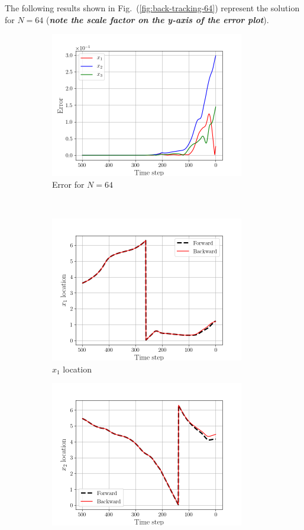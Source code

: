 The following results shown in Fig.~(\ref{fig:back-tracking-64}) represent
the solution for $N=64$ (\emph{\textbf{note the scale factor on the
y-axis of the error plot}}).
\begin{figure}[H]
    \begin{subfigure}[H]{0.45\textwidth}
        \includegraphics[height=2.5in]{media/rk4/run-64/error-64.png}
        \caption{Error for $N=64$}
    \end{subfigure}
    ~
    \begin{subfigure}[H]{0.45\textwidth}
        \includegraphics[height=2.5in]{media/rk4/run-64/x1-64-tracking.png}
        \caption{$x_{1}$ location}
    \end{subfigure}
    \newline
    \begin{subfigure}[H]{0.45\textwidth}
        \includegraphics[height=2.5in]{media/rk4/run-64/x2-64-tracking.png}

\end{subfigure}
\end{figure}
